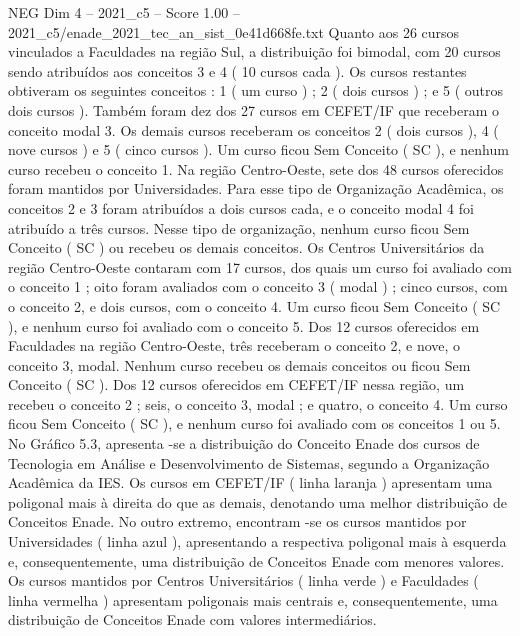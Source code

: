 \begin{textsample}{NEG Dim 4 – 2021\_c5 – Score 1.00 – 2021\_c5/enade\_2021\_tec\_an\_sist\_0e41d668fe.txt}
Quanto aos 26 cursos vinculados a Faculdades na região Sul, a distribuição foi bimodal, com 20 cursos sendo atribuídos aos conceitos 3 e 4 ( 10 cursos cada ).
Os cursos restantes obtiveram os seguintes conceitos : 1 ( um curso ) ; 2 ( dois cursos ) ; e 5 ( outros dois cursos ).
Também foram dez dos 27 cursos em CEFET/IF que receberam o conceito modal 3.
Os demais cursos receberam os conceitos 2 ( dois cursos ), 4 ( nove cursos ) e 5 ( cinco cursos ).
Um curso ficou Sem Conceito ( SC ), e nenhum curso recebeu o conceito 1.
Na região Centro-Oeste, sete dos 48 cursos oferecidos foram mantidos por Universidades.
Para esse tipo de Organização Acadêmica, os conceitos 2 e 3 foram atribuídos a dois cursos cada, e o conceito modal 4 foi atribuído a três cursos.
Nesse tipo de organização, nenhum curso ficou Sem Conceito ( SC ) ou recebeu os demais conceitos.
Os Centros Universitários da região Centro-Oeste contaram com 17 cursos, dos quais um curso foi avaliado com o conceito 1 ; oito foram avaliados com o conceito 3 ( modal ) ; cinco cursos, com o conceito 2, e dois cursos, com o conceito 4.
Um curso ficou Sem Conceito ( SC ), e nenhum curso foi avaliado com o conceito 5.
Dos 12 cursos oferecidos em Faculdades na região Centro-Oeste, três receberam o conceito 2, e nove, o conceito 3, modal.
Nenhum curso recebeu os demais conceitos ou ficou Sem Conceito ( SC ).
Dos 12 cursos oferecidos em CEFET/IF nessa região, um recebeu o conceito 2 ; seis, o conceito 3, modal ; e quatro, o conceito 4.
Um curso ficou Sem Conceito ( SC ), e nenhum curso foi avaliado com os conceitos 1 ou 5.
No Gráfico 5.3, apresenta -se a distribuição do Conceito Enade dos cursos de Tecnologia em Análise e Desenvolvimento de Sistemas, segundo a Organização Acadêmica da IES.
Os cursos em CEFET/IF ( linha laranja ) apresentam uma poligonal mais à direita do que as demais, denotando uma melhor distribuição de Conceitos Enade.
No outro extremo, encontram -se os cursos mantidos por Universidades ( linha azul ), apresentando a respectiva poligonal mais à esquerda e, consequentemente, uma distribuição de Conceitos Enade com menores valores.
Os cursos mantidos por Centros Universitários ( linha verde ) e Faculdades ( linha vermelha ) apresentam poligonais mais centrais e, consequentemente, uma distribuição de Conceitos Enade com valores intermediários.

\end{textsample}
